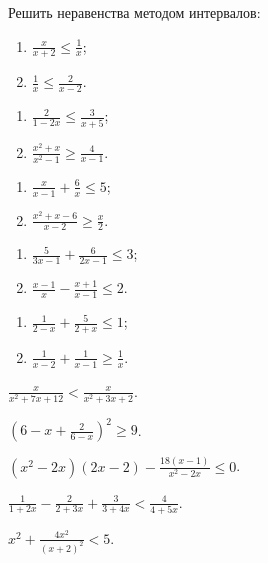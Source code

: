 \documentclass[algebra,a5paper]{pum}
\date{19.05.20}
\begin{document}
\begin{exercises}
  Решить неравенства методом интервалов:
  \begin{question}
    \begin{enumerate}[itemsep=6pt]
        \item $\frac{x}{x+2}\le\frac{1}{x}$;
        \item $\frac{1}{x}\le\frac{2}{x-2}$.
      \end{enumerate}
  \end{question}
  \begin{question}
      \begin{enumerate}[itemsep=6pt]
        \item $\frac{2}{1-2x}\le\frac{3}{x+5}$;
        \item $\frac{x^2+x}{x^2-1}\ge\frac{4}{x-1}$.
      \end{enumerate}
  \end{question}
  \begin{question}
      \begin{enumerate}[itemsep=6pt]
        \item $\frac{x}{x-1}+\frac{6}{x}\le5$;
        \item $\frac{x^2+x-6}{x-2}\ge\frac{x}{2}$.
      \end{enumerate}
  \end{question}
  \begin{question}
      \begin{enumerate}[itemsep=6pt]
        \item $\frac{5}{3x-1}+\frac{6}{2x-1}\le3$;
        \item $\frac{x-1}{x}-\frac{x+1}{x-1}\le2$.
      \end{enumerate}
  \end{question}
  \begin{question}
      \begin{enumerate}[itemsep=6pt]
        \item $\frac{1}{2-x}+\frac{5}{2+x}\le1$;
        \item $\frac{1}{x-2}+\frac{1}{x-1}\ge\frac{1}{x}$.
      \end{enumerate}
  \end{question}
  \begin{question}
    $\frac{x}{x^2+7x+12}<\frac{x}{x^2+3x+2}$.
  \end{question}
  \begin{question}
    $\left(6-x+\frac{2}{6-x}\right)^2\ge9$.
  \end{question}
  \begin{question}
    $(x^2-2x)(2x-2)-\frac{18(x-1)}{x^2-2x}\le0$.
  \end{question}
  \begin{question}
    $\frac{1}{1+2x}-\frac{2}{2+3x}+\frac{3}{3+4x}<\frac{4}{4+5x}$.
  \end{question}
  \begin{question}
    $x^2+\frac{4x^2}{(x+2)^2}<5$.
  \end{question}
\end{exercises}
\end{document}
